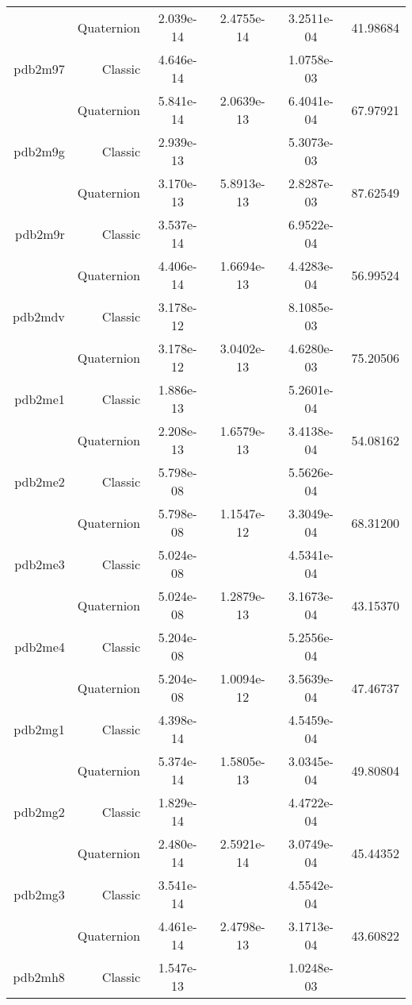 \begin{xltabular}{\textwidth}{r|rS[table-format=1.3e+2]S[table-format=1.4e+2]S[table-format=1.4e+2]S[table-format=-1.5]}
& Quaternion & 2.039e-14 & 2.4755e-14 & 3.2511e-04 & 41.98684\\  \addlinespace
pdb2m97 & Classic & 4.646e-14 &  & 1.0758e-03 & \\
& Quaternion & 5.841e-14 & 2.0639e-13 & 6.4041e-04 & 67.97921\\  \addlinespace
pdb2m9g & Classic & 2.939e-13 &  & 5.3073e-03 & \\
& Quaternion & 3.170e-13 & 5.8913e-13 & 2.8287e-03 & 87.62549\\  \addlinespace
pdb2m9r & Classic & 3.537e-14 &  & 6.9522e-04 & \\
& Quaternion & 4.406e-14 & 1.6694e-13 & 4.4283e-04 & 56.99524\\  \addlinespace
pdb2mdv & Classic & 3.178e-12 &  & 8.1085e-03 & \\
& Quaternion & 3.178e-12 & 3.0402e-13 & 4.6280e-03 & 75.20506\\  \addlinespace
pdb2me1 & Classic & 1.886e-13 &  & 5.2601e-04 & \\
& Quaternion & 2.208e-13 & 1.6579e-13 & 3.4138e-04 & 54.08162\\  \addlinespace
pdb2me2 & Classic & 5.798e-08 &  & 5.5626e-04 & \\
& Quaternion & 5.798e-08 & 1.1547e-12 & 3.3049e-04 & 68.31200\\  \addlinespace
pdb2me3 & Classic & 5.024e-08 &  & 4.5341e-04 & \\
& Quaternion & 5.024e-08 & 1.2879e-13 & 3.1673e-04 & 43.15370\\  \addlinespace
pdb2me4 & Classic & 5.204e-08 &  & 5.2556e-04 & \\
& Quaternion & 5.204e-08 & 1.0094e-12 & 3.5639e-04 & 47.46737\\  \addlinespace
pdb2mg1 & Classic & 4.398e-14 &  & 4.5459e-04 & \\
& Quaternion & 5.374e-14 & 1.5805e-13 & 3.0345e-04 & 49.80804\\  \addlinespace
pdb2mg2 & Classic & 1.829e-14 &  & 4.4722e-04 & \\
& Quaternion & 2.480e-14 & 2.5921e-14 & 3.0749e-04 & 45.44352\\  \addlinespace
pdb2mg3 & Classic & 3.541e-14 &  & 4.5542e-04 & \\
& Quaternion & 4.461e-14 & 2.4798e-13 & 3.1713e-04 & 43.60822\\  \addlinespace
pdb2mh8 & Classic & 1.547e-13 &  & 1.0248e-03 & \\

\end{xltabular}
